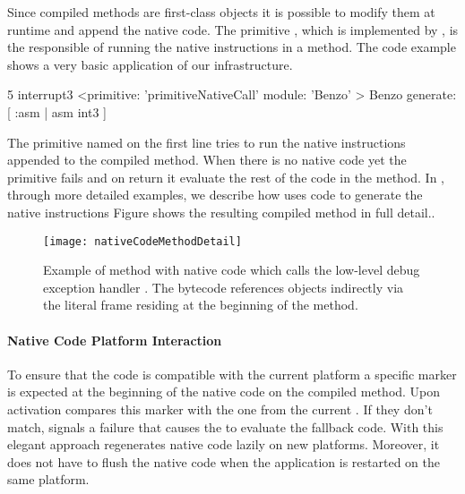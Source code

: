 \noindent Since compiled methods are first-class objects it is possible to modify them at runtime and append the native code.
The primitive , which is implemented by \B, is the responsible of running the native instructions in a \PH method.
The code example  shows a very basic application of our infrastructure.
%
\begin{stcode}[label={lst:benzo-basic-native-code}, caption={\PH method using \B for very basic low-level debugging.}, escapeinside={@}{@}]{5}
interrupt3
	<primitive: 'primitiveNativeCall' 
	 module: 'Benzo' >
	Benzo generate: [ :asm | asm int3 ]
\end{stcode}
%
The primitive named  on the first line tries to run the native instructions appended to the compiled method.
When there is no native code yet the primitive fails and on return it evaluate the rest of the \PH code in the method.
In , through more detailed examples, we describe how \B uses \PH code to generate the native instructions
Figure  shows the resulting compiled method in full detail..
%
\begin{figure}[ht]
    \centering
    \texttt{[image: nativeCodeMethodDetail]}
    \caption[ With \B Code]{Example of \PH method with native code which calls the low-level debug exception handler . The bytecode references objects indirectly via the literal frame residing at the beginning of the method.}
\end{figure}

\paragraph{Native Code Platform Interaction}

To ensure that the code is compatible with the current platform a \VM specific marker is expected at the beginning of the native code on the compiled method.
Upon activation \B compares this marker with the one from the current \VM.
If they don't match, \B signals a failure that causes the \VM to evaluate the fallback \PH code.
With this elegant approach \B regenerates native code lazily on new platforms.
Moreover, it does not have to flush the native code when the application is restarted on the same platform.

